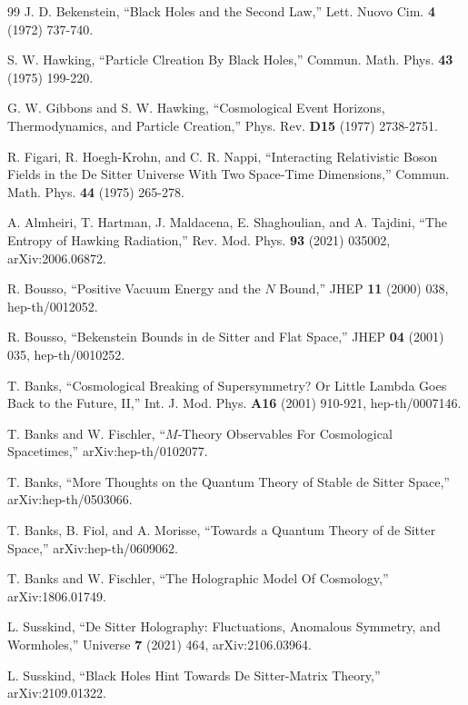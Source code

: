 \documentclass[11pt,a4paper]{article}
\begin{document}
 
\begin{thebibliography}{99}
J. D. Bekenstein, ``Black Holes and the Second Law,'' Lett. Nuovo Cim. {\bf 4} (1972) 737-740.

S. W. Hawking, ``Particle Clreation By Black Holes,'' Commun. Math. Phys. {\bf 43} (1975) 199-220. 

G. W. Gibbons and S. W. Hawking, ``Cosmological Event Horizons,
Thermodynamics, and Particle Creation,'' 
Phys. Rev. {\bf D15} (1977) 2738-2751.

R. Figari, R. Hoegh-Krohn, and C. R. Nappi, ``Interacting
Relativistic Boson Fields in the De Sitter Universe With Two Space-Time
Dimensions,''
Commun. Math. Phys. {\bf 44} (1975) 265-278.



A. Almheiri, T. Hartman, J. Maldacena, E. Shaghoulian, and A. Tajdini,
``The Entropy of Hawking Radiation,'' Rev. Mod. Phys. {\bf 93} (2021) 035002, arXiv:2006.06872.

R. Bousso, ``Positive Vacuum Energy and the $N$ Bound,'' JHEP {\bf 11} (2000) 038, hep-th/0012052.

 R. Bousso, ``Bekenstein Bounds in de Sitter and Flat Space,'' JHEP {\bf 04} (2001) 035, hep-th/0010252.

T. Banks, ``Cosmological Breaking of Supersymmetry?  Or Little Lambda Goes Back to the Future, II,'' Int. J. Mod. Phys. {\bf A16}
(2001) 910-921,  hep-th/0007146.

T. Banks and W. Fischler, ``$M$-Theory Observables For Cosmological Spacetimes,'' arXiv:hep-th/0102077.





T. Banks, ``More Thoughts on the Quantum Theory
of Stable de Sitter Space,'' arXiv:hep-th/0503066.

T. Banks, B. Fiol, and A. Morisse, ``Towards a Quantum
Theory of de Sitter Space,'' arXiv:hep-th/0609062.

T. Banks and W. Fischler, ``The Holographic Model Of Cosmology,'' arXiv:1806.01749.

L. Susskind, ``De Sitter Holography: Fluctuations, Anomalous Symmetry, and Wormholes,''  Universe {\bf 7} (2021) 464,
arXiv:2106.03964.

L. Susskind, ``Black Holes Hint Towards De Sitter-Matrix Theory,''
arXiv:2109.01322.



\end{thebibliography}
\end{document}
